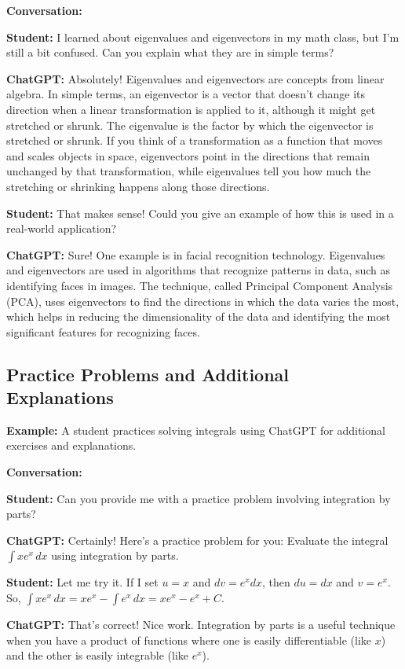 \documentclass{article}
\begin{document}
\textbf{Conversation:}
\begin{mdframed}
\begin{flushleft}
\textbf{Student:} I learned about eigenvalues and eigenvectors in my math class, but I'm still a bit confused. Can you explain what they are in simple terms?

\textbf{ChatGPT:} Absolutely! Eigenvalues and eigenvectors are concepts from linear algebra. In simple terms, an eigenvector is a vector that doesn't change its direction when a linear transformation is applied to it, although it might get stretched or shrunk. The eigenvalue is the factor by which the eigenvector is stretched or shrunk. If you think of a transformation as a function that moves and scales objects in space, eigenvectors point in the directions that remain unchanged by that transformation, while eigenvalues tell you how much the stretching or shrinking happens along those directions.

\textbf{Student:} That makes sense! Could you give an example of how this is used in a real-world application?

\textbf{ChatGPT:} Sure! One example is in facial recognition technology. Eigenvalues and eigenvectors are used in algorithms that recognize patterns in data, such as identifying faces in images. The technique, called Principal Component Analysis (PCA), uses eigenvectors to find the directions in which the data varies the most, which helps in reducing the dimensionality of the data and identifying the most significant features for recognizing faces.
\end{flushleft}
\end{mdframed}

\subsection{Practice Problems and Additional Explanations}

\textbf{Example:} A student practices solving integrals using ChatGPT for additional exercises and explanations.

\textbf{Conversation:}
\begin{mdframed}
\begin{flushleft}
\textbf{Student:} Can you provide me with a practice problem involving integration by parts?

\textbf{ChatGPT:} Certainly! Here's a practice problem for you:
Evaluate the integral \(\int x e^x \, dx\) using integration by parts.

\textbf{Student:} Let me try it. If I set \(u = x\) and \(dv = e^x dx\), then \(du = dx\) and \(v = e^x\). So, \(\int x e^x \, dx = x e^x - \int e^x \, dx = x e^x - e^x + C\).

\textbf{ChatGPT:} That's correct! Nice work. Integration by parts is a useful technique when you have a product of functions where one is easily differentiable (like \(x\)) and the other is easily integrable (like \(e^x\)).
\end{flushleft}
\end{mdframed}
\end{document}
